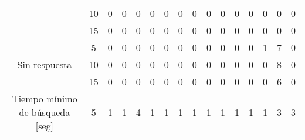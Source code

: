 \begin{sidewaystable}
\begin{tabular}{@{}ccc|rrrrrrrrrrrrrr@{}}
                                     &                             & 10 & 0                      & 0                      & 0                      & 0                      & 0                      & 0                      & 0                      & 0                      & 0                      & 0                      & 0                      & 0                      & 0                      & 0                      \\
                                     &                             & 15 & 0                      & 0                      & 0                      & 0                      & 0                      & 0                      & 0                      & 0                      & 0                      & 0                      & 0                      & 0                      & 0                      & 0                      \\
\midrule
\multicolumn{2}{c}{\multirow{3}{*}{Sin respuesta}}                 & 5  & 0                      & 0                      & 0                      & 0                      & 0                      & 0                      & 0                      & 0                      & 0                      & 0                      & 0                      & 1                      & 7                      & 0                      \\
\multicolumn{2}{c}{}                                               & 10 & 0                      & 0                      & 0                      & 0                      & 0                      & 0                      & 0                      & 0                      & 0                      & 0                      & 0                      & 0                      & 8                      & 0                      \\
\multicolumn{2}{c}{}                                               & 15 & 0                      & 0                      & 0                      & 0                      & 0                      & 0                      & 0                      & 0                      & 0                      & 0                      & 0                      & 0                      & 6                      & 0                      \\
\midrule
\multicolumn{2}{c}{\multirow{3}{*}{Tiempo mínimo de búsqueda {[}seg{]}}}     & 5  & 1                      & 1                      & 4                      & 1                      & 1                      & 1                      & 1                      & 1                      & 1                      & 1                      & 1                      & 1                      & 3                      & 3                      \\

\end{tabular}
\end{sidewaystable}

